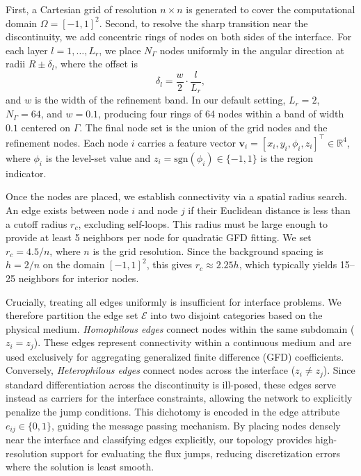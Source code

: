 \documentclass[11pt]{article}
\theoremstyle{definition}
\theoremstyle{remark}
\theoremstyle{plain}
\begin{document}
First, a Cartesian grid of resolution $n \times n$ is generated to cover the computational domain $\Omega = [-1,1]^2$. Second, to resolve the sharp transition near the discontinuity, we add concentric rings of nodes on both sides of the interface. For each layer $l = 1, \ldots, L_r$, we place $N_\Gamma$ nodes uniformly in the angular direction at radii $R \pm \delta_l$, where the offset is
\begin{equation}
    \delta_l = \frac{w}{2} \cdot \frac{l}{L_r},
\end{equation}
and $w$ is the width of the refinement band. In our default setting, $L_r = 2$, $N_\Gamma = 64$, and $w = 0.1$, producing four rings of 64 nodes within a band of width $0.1$ centered on $\Gamma$. The final node set is the union of the grid nodes and the refinement nodes. Each node $i$ carries a feature vector $\mathbf{v}_i = [x_i, y_i, \phi_i, z_i]^\top \in \mathbb{R}^4$, where $\phi_i$ is the level-set value and $z_i = \text{sgn}(\phi_i) \in \{-1, 1\}$ is the region indicator.

Once the nodes are placed, we establish connectivity via a spatial radius search. An edge exists between node $i$ and node $j$ if their Euclidean distance is less than a cutoff radius $r_c$, excluding self-loops. This radius must be large enough to provide at least 5 neighbors per node for quadratic GFD fitting. We set $r_c = 4.5 / n$, where $n$ is the grid resolution. Since the background spacing is $h = 2/n$ on the domain $[-1,1]^2$, this gives $r_c \approx 2.25 h$, which typically yields 15--25 neighbors for interior nodes.

Crucially, treating all edges uniformly is insufficient for interface problems. We therefore partition the edge set $\mathcal{E}$ into two disjoint categories based on the physical medium. \textit{Homophilous edges} connect nodes within the same subdomain ($z_i = z_j$). These edges represent connectivity within a continuous medium and are used exclusively for aggregating generalized finite difference (GFD) coefficients. Conversely, \textit{Heterophilous edges} connect nodes across the interface ($z_i \neq z_j$). Since standard differentiation across the discontinuity is ill-posed, these edges serve instead as carriers for the interface constraints, allowing the network to explicitly penalize the jump conditions. This dichotomy is encoded in the edge attribute $e_{ij} \in \{0, 1\}$, guiding the message passing mechanism. By placing nodes densely near the interface and classifying edges explicitly, our topology provides high-resolution support for evaluating the flux jumps, reducing discretization errors where the solution is least smooth.
\end{document}
